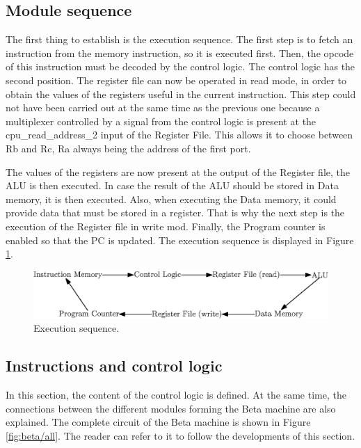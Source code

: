 \subsection{Module sequence}

The first thing to establish is the execution sequence.  The first step is to fetch an instruction 
from the memory instruction, so it is executed first. Then, the opcode of this instruction must be 
decoded by the control logic. The control logic has the second position. The register file can now 
be operated in read mode, in order to obtain the values of the registers useful in the current 
instruction. This step could not have been carried out at the same time as the previous one because 
a multiplexer controlled by a signal from the control logic is present at the cpu\_read\_address\_2 
input of the Register File. This allows it to choose between Rb and Rc, Ra always being the address 
of the first port. 

The values of the registers are now present at the output of the Register file, the ALU is then 
executed. In case the result of the ALU should be stored in Data memory, it is then executed. Also, when 
executing the Data memory, it could provide data that must be stored in a register. That is why the 
next step is the execution of the Register file in write mod. Finally, the Program counter is enabled 
so that the PC is updated. The execution sequence is displayed in Figure \ref{fig:beta/sequence}.

\begin{figure}[H]
    \centering
    \includegraphics[scale=0.8]{Chapter3-CPU/res/sequence}
    \caption{Execution sequence.}
    \label{fig:beta/sequence}
\end{figure}

\subsection{Instructions and control logic}

In this section, the content of the control logic is defined. At the same time, the connections 
between the different modules forming the Beta machine are also explained. The complete circuit of 
the Beta machine is shown in Figure \ref{fig:beta/all}. The reader can refer to it to follow the 
developments of this section.

